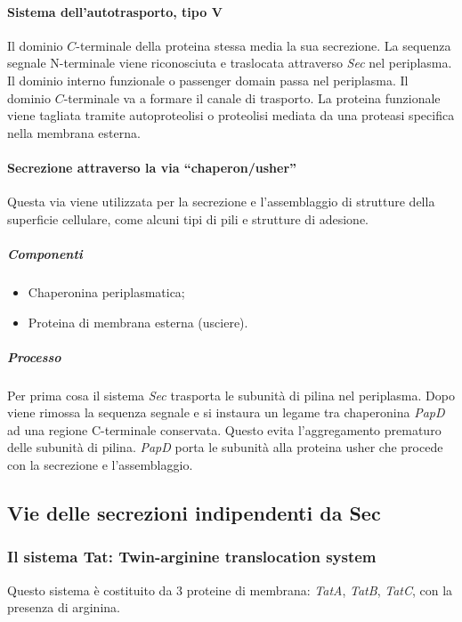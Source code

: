 			\paragraph{Sistema dell'autotrasporto, tipo $\mathbf{V}$}
			Il dominio $C$-terminale della proteina stessa media la sua secrezione.
			La sequenza segnale N-terminale viene riconosciuta e traslocata attraverso \emph{Sec} nel periplasma.
			Il dominio interno funzionale o passenger domain passa nel periplasma.
			Il dominio $C$-terminale va a formare il canale di trasporto. 
			La proteina funzionale viene tagliata tramite autoproteolisi o proteolisi mediata da una proteasi specifica nella membrana esterna.

			\paragraph{Secrezione attraverso la via ``chaperon/usher''}
			Questa via viene utilizzata per la secrezione e l'assemblaggio di strutture della superficie cellulare, come alcuni tipi di pili e strutture di adesione. 
			
				\subparagraph{Componenti}
				\begin{itemize}
					\item Chaperonina periplasmatica; 
	    				\item Proteina di membrana esterna (usciere).
				\end{itemize}

				\subparagraph{Processo}
				Per prima cosa il sistema \emph{Sec} trasporta le subunit\`a di pilina nel periplasma. 
				Dopo viene rimossa la sequenza segnale e si instaura un legame tra chaperonina \emph{PapD} ad una regione C-terminale conservata. 
				Questo evita l'aggregamento prematuro delle subunit\`a di pilina. 
				\emph{PapD} porta le subunit\`a alla proteina usher che procede con la secrezione e l'assemblaggio.

	\subsection{Vie delle secrezioni indipendenti da Sec}

		\subsubsection{Il sistema Tat: Twin-arginine translocation system}
		Questo sistema \`e costituito da 3 proteine di membrana: \emph{TatA}, \emph{TatB}, \emph{TatC}, con la presenza di arginina. 

